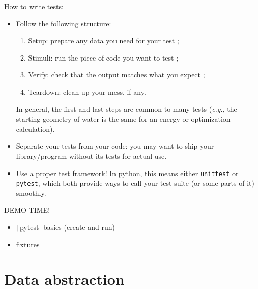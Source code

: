 \documentclass[10pt,
aspectratio=169
]{beamer}
\begin{document}
\begin{frame}
	How to write tests:\begin{itemize}
		\item Follow the following structure:\begin{enumerate}
			\item Setup: prepare any data you need for your test ;
			\item Stimuli: run the piece of code you want to test ;
			\item Verify: check that the output matches what you expect ;
			\item Teardown: clean up your mess, if any.
		\end{enumerate}
		In general, the first and last steps are common to many tests (\textit{e.g.}, the starting geometry of water is the same for an energy or optimization calculation).
		\item Separate your tests from your code: you may want to ship your library/program without its tests for actual use.
		\item Use a proper test framework! In python, this means either \texttt{unittest} or \texttt{pytest}, which both provide ways to call your test suite (or some parts of it) smoothly.
	\end{itemize}
\end{frame}

\begin{frame}
\begin{center}
	{\LARGE DEMO TIME!}
	
	\begin{itemize}
		\item \texttt|pytest| basics (create and run)
		\item fixtures
	\end{itemize}
\end{center}
\end{frame}

\section{Data abstraction}


\newcommand{\Ox}[1]{\ensuremath{\mathcal{O}(#1)}}
\end{document}
